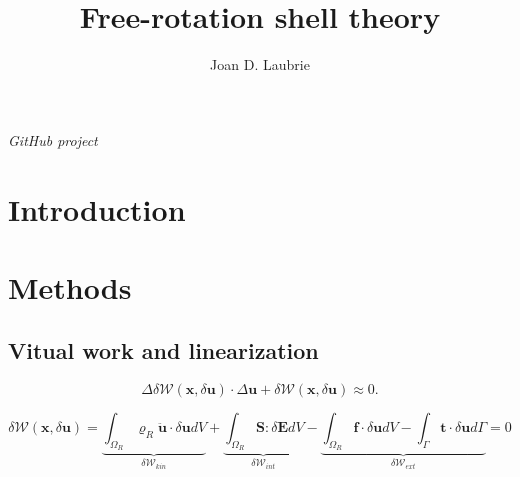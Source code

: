 \documentclass[12pt]{article}
\date{}
\title{Free-rotation shell theory}
\author{Joan D. Laubrie}
\begin{document}
\renewcommand{\refname}{9\hspace*{20pt}References}
\maketitle


\vspace{-10mm}
\begin{center}
{\footnotesize \it{GitHub project}}
\end{center}


\section{Introduction}\label{introduction}
%
%
\section{Methods}\label{methods}
%
\subsection{Vitual work and linearization}
%
\begin{equation}
\Delta\delta\mathcal{W}(\pmb{x},\delta\pmb{u})\cdot\Delta\pmb{u} + 
\delta\mathcal{W}(\pmb{x},\delta\pmb{u}) \approx 0.
\end{equation}

\begin{equation}
\delta \mathcal{W}(\pmb{x},\delta\pmb{u}) = 
\underbrace{\int_{\Omega_R}\varrho_R\pmb{\ddot{u}}\cdot\delta\pmb{u} 
dV}_{\delta\mathcal{W}_{kin}} +
\underbrace{\int_{\Omega_R}\pmb{S}:\delta\pmb{E} 
dV}_{\delta\mathcal{W}_{int}} -
\underbrace{\int_{\Omega_R}\pmb{f}\cdot\delta\pmb{u} dV 
-\int_{\Gamma}\pmb{t}\cdot\delta\pmb{u} 
d\Gamma}_{\delta\mathcal{W}_{ext}} = 0
\label{virtual_work}
\end{equation}
\end{document}
